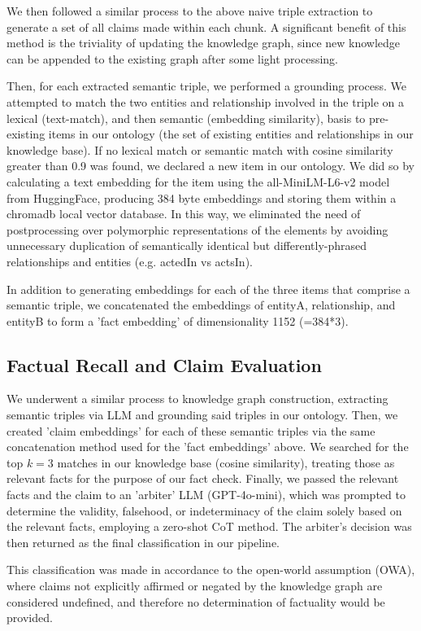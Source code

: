 \documentclass[11pt]{article}
\begin{document}
We then followed a similar process to the above naive triple extraction to generate a set of all claims made within each chunk. A significant benefit of this method is the triviality of updating the knowledge graph, since new knowledge can be appended to the existing graph after some light processing.

Then, for each extracted semantic triple, we performed a grounding process. We attempted to match the two entities and relationship involved in the triple on a lexical (text-match), and then semantic (embedding similarity), basis to pre-existing items in our ontology (the set of existing entities and relationships in our knowledge base). If no lexical match or semantic match with cosine similarity greater than 0.9 was found, we declared a new item in our ontology. We did so by calculating a text embedding for the item using the all-MiniLM-L6-v2 model from HuggingFace, producing 384 byte embeddings and storing them within a chromadb local vector database. In this way, we eliminated the need of postprocessing over polymorphic representations of the elements by avoiding unnecessary duplication of semantically identical but differently-phrased relationships and entities (e.g. actedIn vs actsIn).

In addition to generating embeddings for each of the three items that comprise a semantic triple, we concatenated the embeddings of entityA, relationship, and entityB to form a 'fact embedding' of dimensionality 1152 (=384*3).

\subsection{Factual Recall and Claim Evaluation}
We underwent a similar process to knowledge graph construction, extracting semantic triples via LLM and grounding said triples in our ontology. Then, we created 'claim embeddings' for each of these semantic triples via the same concatenation method used for the 'fact embeddings' above. We searched for the top $k=3$ matches in our knowledge base (cosine similarity), treating those as relevant facts for the purpose of our fact check. Finally, we passed the relevant facts and the claim to an 'arbiter' LLM (GPT-4o-mini), which was prompted to determine the validity, falsehood, or indeterminacy of the claim solely based on the relevant facts, employing a zero-shot CoT method. The arbiter's decision was then returned as the final classification in our pipeline.

This classification was made in accordance to the open-world assumption (OWA), where claims not explicitly affirmed or negated by the knowledge graph are considered undefined, and therefore no determination of factuality would be provided.
\end{document}
